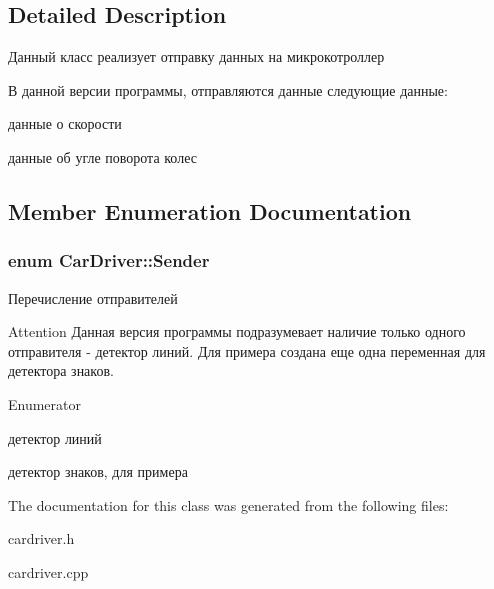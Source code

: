 \subsection{Detailed Description}
Данный класс реализует отправку данных на микрокотроллер 

В данной версии программы, отправляются данные следующие данные\+:
\begin{DoxyItemize}
\item данные о скорости
\item данные об угле поворота колес 
\end{DoxyItemize}

\subsection{Member Enumeration Documentation}
\hypertarget{class_car_driver_a33fd0b7844018f8894fcbdb4c4edd0fe}{
\subsubsection[{Sender}]{\setlength{\rightskip}{0pt plus 5cm}enum {\bf Car\+Driver\+::\+Sender}}}\label{class_car_driver_a33fd0b7844018f8894fcbdb4c4edd0fe}


Перечисление отправителей 

\begin{DoxyAttention}{Attention}
Данная версия программы подразумевает наличие только одного отправителя -\/ детектор линий. Для примера создана еще одна переменная для детектора знаков. 
\end{DoxyAttention}
\begin{Desc}
\item[Enumerator]\par
\begin{description}
\item[{\em 
\hypertarget{class_car_driver_a33fd0b7844018f8894fcbdb4c4edd0fea6d3ce5a8c8d7edb78a78e72cd323337e}{L\+I\+N\+E\+\_\+\+D\+E\+T\+E\+C\+T\+O\+R}\label{class_car_driver_a33fd0b7844018f8894fcbdb4c4edd0fea6d3ce5a8c8d7edb78a78e72cd323337e}
}]детектор линий \item[{\em 
\hypertarget{class_car_driver_a33fd0b7844018f8894fcbdb4c4edd0fea2d884b64ff97cf1faad6c92441ebb85a}{S\+I\+G\+N\+\_\+\+D\+E\+T\+E\+C\+T\+O\+R}\label{class_car_driver_a33fd0b7844018f8894fcbdb4c4edd0fea2d884b64ff97cf1faad6c92441ebb85a}
}]детектор знаков, для примера \end{description}
\end{Desc}


The documentation for this class was generated from the following files\+:\begin{DoxyCompactItemize}
\item 
cardriver.\+h\item 
cardriver.\+cpp\end{DoxyCompactItemize}
